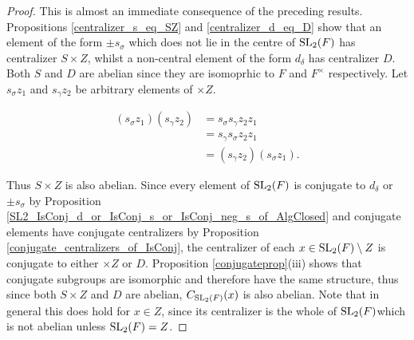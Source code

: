 \begin{proof}
    \leanok
    This is almost an immediate consequence of the preceding results. Propositions \ref{centralizer_s_eq_SZ} and \ref{centralizer_d_eq_D} show that an element of the form $\pm s_\sigma$ which does not lie in the centre of $\operatorname{SL}_2(F)$ has centralizer $S \times Z$, whilst a non-central element of the form $d_\delta$ has centralizer $D$.
Both $S$ and $D$ are abelian since they are isomoprhic to $F$ and $F^\times$ respectively. Let $s_\sigma z_1$ and $s_\gamma z_2$  be arbitrary elements of $\times Z$.

\vspace{-.5mm}
\begin{align*} 
    (s_\sigma z_1)(s_\gamma z_2)  &= s_\sigma s_\gamma z_2 z_1  \tag{since  $z_1 \in Z$}
\\ &= s_\gamma s_\sigma z_2 z_1  \tag{since  $T$ is abelian}
\\ &= (s_\gamma z_2)(s_\sigma z_1).   \tag{since  $z_2 \in Z$}
\end{align*} 

Thus $S \times Z$ is also abelian. Since every element of $\operatorname{SL}_2(F)$ is conjugate to $d_\delta$ or $\pm s_\sigma$ by Proposition \ref{SL2_IsConj_d_or_IsConj_s_or_IsConj_neg_s_of_AlgClosed} and conjugate elements have conjugate centralizers by Proposition \ref{conjugate_centralizers_of_IsConj}, the centralizer of each $x \in \operatorname{SL}_2(F)\setminus Z$ is conjugate to either $\times Z$ or $D$. 
Proposition \ref{conjugateprop}(iii) shows that conjugate subgroups are isomorphic and therefore have the same structure, thus since both $S \times Z$ and $D$ are abelian, $C_{\operatorname{SL}_2(F)}(x)$ is also abelian. 
Note that in general this does hold for $x \in Z$, since its centralizer is the whole of $\operatorname{SL}_2(F)$which is not abelian unless $\operatorname{SL}_2(F)= Z$.

\end{proof}
